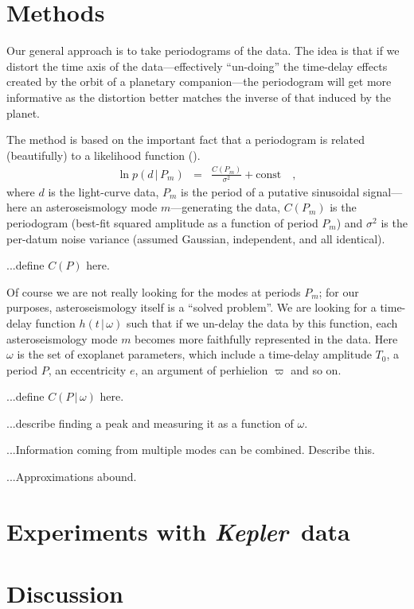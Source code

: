\documentclass[12pt, preprint]{aastex}
\newcommand{\project}[1]{\textsl{#1}}
\newcommand{\Kepler}{\project{Kepler}}
\newcommand{\given}{\,|\,}
\begin{document}
\section{Methods}

Our general approach is to take periodograms of the data.
The idea is that if we distort the time axis of the data---effectively
``un-doing'' the time-delay effects created by the orbit of a
planetary companion---the periodogram will get more informative as the
distortion better matches the inverse of that induced by the planet.

The method is based on the important fact that a periodogram is
related (beautifully) to a likelihood function (\citealt{bretthorst}).
\begin{eqnarray}
\ln p(d\given P_m) &=& \frac{C(P_m)}{\sigma^2} + \mbox{const}
\quad,
\end{eqnarray}
where $d$ is the light-curve data, $P_m$ is the period of a putative
sinusoidal signal---here an asteroseismology mode $m$---generating the
data, $C(P_m)$ is the periodogram (best-fit squared amplitude as a
function of period $P_m$) and $\sigma^2$ is the per-datum noise
variance (assumed Gaussian, independent, and all identical).

...define $C(P)$ here.

Of course we are not really looking for the modes at periods $P_m$;
for our purposes, asteroseismology itself is a ``solved problem''.
We are looking for a time-delay function $h(t\given \omega)$ such that
if we un-delay the data by this function, each asteroseismology mode
$m$ becomes more faithfully represented in the data.
Here $\omega$ is the set of exoplanet parameters, which include a
time-delay amplitude $T_0$, a period $P$, an eccentricity $e$, an
argument of perhielion $\varpi$ and so on.

...define $C(P\given \omega)$ here.

...describe finding a peak and measuring it as a function of $\omega$.

...Information coming from multiple modes can be combined.  Describe
this.

...Approximations abound.

\section{Experiments with \Kepler\ data}

\section{Discussion}
\end{document}
